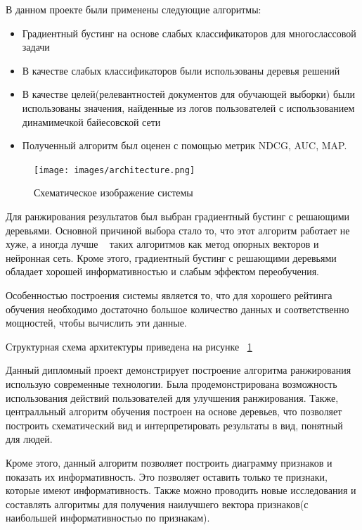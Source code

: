 В данном проекте были применены следующие алгоритмы:

\begin{itemize}
	\item Градиентный бустинг на основе слабых классификаторов для многослассовой задачи
	\item В качестве слабых классификаторов были использованы деревья решений
	\item В качестве целей(релевантностей документов для обучающей выборки) были использованы значения, найденные из логов пользователей с использованием динамимечкой байесовской сети
	\item Полученный алгоритм был оценен с помощью метрик NDCG, AUC, MAP.
\end{itemize}

\begin{figure}
  \centering
  \texttt{[image: images/architecture.png]}
  \caption{Схематическое изображение системы\label{architecture}}
\end{figure}

Для ранжирования результатов был выбран градиентный бустинг с решающими деревьями. Основной причиной выбора стало то, что этот алгоритм работает не хуже, а иногда лучше ~\cite{cart_estimation_book} таких алгоритмов как метод опорных векторов и нейронная сеть. Кроме этого, градиентный бустинг с решающими деревьями обладает хорошей информативностью и слабым эффектом переобучения. ~\cite{cart_estimation_book}

Особенностью построения системы является то, что для хорошего рейтинга обучения необходимо достаточно большое количество данных и соответственно мощностей, чтобы вычислить эти данные. 

Структурная схема архитектуры приведена на рисунке ~\ref{architecture}

Данный дипломный проект демонстрирует построение алгоритма ранжирования использую современные технологии. Была продемонстрирована возможность использования действий пользователей для улучшения ранжирования. Также, централльный алгоритм обучения построен на основе деревьев, что позволяет построить схематический вид и интерпретировать результаты в вид, понятный для людей. 

Кроме этого, данный алгоритм позволяет построить диаграмму признаков и показать их информативность. Это позволяет оставить только те признаки, которые имеют информативность. Также можно проводить новые исследования и составлять алгоритмы для получения наилучшего вектора признаков(с наибольшей информативностью по признакам).

